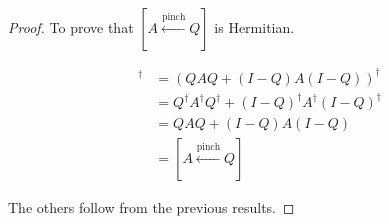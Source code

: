 \begin{proof}
To prove that $[A \overset{\text{pinch}}{\gets} Q]$ is Hermitian.

\begin{align*}
    [A \overset{\text{pinch}}{\gets} Q]^\dagger &=  \left(Q A Q + (I-Q) A (I - Q)\right)^\dagger \\
    &= Q^\dagger A^\dagger Q^\dagger + (I - Q)^\dagger A^\dagger (I-Q)^\dagger\\
    &= Q A Q + (I-Q) A (I - Q)\\
    &= [A \overset{\text{pinch}}{\gets} Q]
\end{align*}

\noindent The others follow from the previous results.




    
\end{proof}




